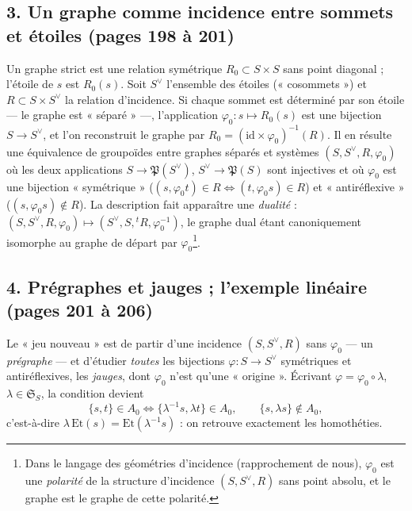 \documentclass[11pt,a4paper]{article}
\begin{document}
\subsection*{3. Un graphe comme incidence entre sommets et étoiles (pages 198 à 201)}

Un graphe strict est une relation symétrique $R_0 \subset S \times S$ sans
point diagonal ; l'étoile de $s$ est $R_0(s)$. Soit $S^{\vee}$ l'ensemble des
étoiles (« cosommets ») et $R \subset S \times S^{\vee}$ la relation
d'incidence. Si chaque sommet est déterminé par son étoile --- le graphe est
« séparé » ---, l'application $\varphi_0 : s \mapsto R_0(s)$ est une bijection
$S \to S^{\vee}$, et l'on reconstruit le graphe par $R_0 = (\mathrm{id} \times
\varphi_0)^{-1}(R)$. Il en résulte une équivalence de groupoïdes entre graphes
séparés et systèmes $(S, S^{\vee}, R, \varphi_0)$ où les deux applications $S
\to \mathfrak{P}(S^{\vee})$, $S^{\vee} \to \mathfrak{P}(S)$ sont injectives et
où $\varphi_0$ est une bijection « symétrique » ($(s, \varphi_0 t) \in R \iff (t,
\varphi_0 s) \in R$) et « antiréflexive » ($(s, \varphi_0 s) \notin R$). La
description fait apparaître une \emph{dualité} : $(S, S^{\vee}, R, \varphi_0)
\mapsto (S^{\vee}, S, {}^{t}R, \varphi_0^{-1})$, le graphe dual étant
canoniquement isomorphe au graphe de départ par $\varphi_0$\footnote{Dans le
langage des géométries d'incidence (rapprochement de nous), $\varphi_0$ est une
\emph{polarité} de la structure d'incidence $(S, S^{\vee}, R)$ sans point
absolu, et le graphe est le graphe de cette polarité.}.

\subsection*{4. Prégraphes et jauges ; l'exemple linéaire (pages 201 à 206)}

Le « jeu nouveau » est de partir d'une incidence $(S, S^{\vee}, R)$ sans
$\varphi_0$ --- un \emph{prégraphe} --- et d'étudier \emph{toutes} les
bijections $\varphi : S \to S^{\vee}$ symétriques et antiréflexives, les
\emph{jauges}, dont $\varphi_0$ n'est qu'une « origine ». Écrivant $\varphi =
\varphi_0 \circ \lambda$, $\lambda \in \mathfrak{S}_S$, la condition devient
\[
  \{s, t\} \in A_0 \iff \{\lambda^{-1}s, \lambda t\} \in A_0 , \qquad
  \{s, \lambda s\} \notin A_0 ,
\]
c'est-à-dire $\lambda\,\mathrm{Et}(s) = \mathrm{Et}(\lambda^{-1}s)$ : on retrouve
exactement les homothéties.
\end{document}
